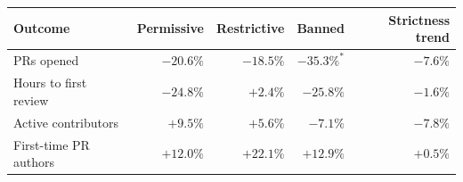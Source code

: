 \begin{tabular}{lrrrr}
\toprule
Outcome & Permissive & Restrictive & Banned & Strictness trend \\
\midrule
PRs opened & $-20.6\%$ & $-18.5\%$ & $-35.3\%^{*}$ & $-7.6\%$ \\
Hours to first review & $-24.8\%$ & $+2.4\%$ & $-25.8\%$ & $-1.6\%$ \\
Active contributors & $+9.5\%$ & $+5.6\%$ & $-7.1\%$ & $-7.8\%$ \\
First-time PR authors & $+12.0\%$ & $+22.1\%$ & $+12.9\%$ & $+0.5\%$ \\
\bottomrule
\end{tabular}
